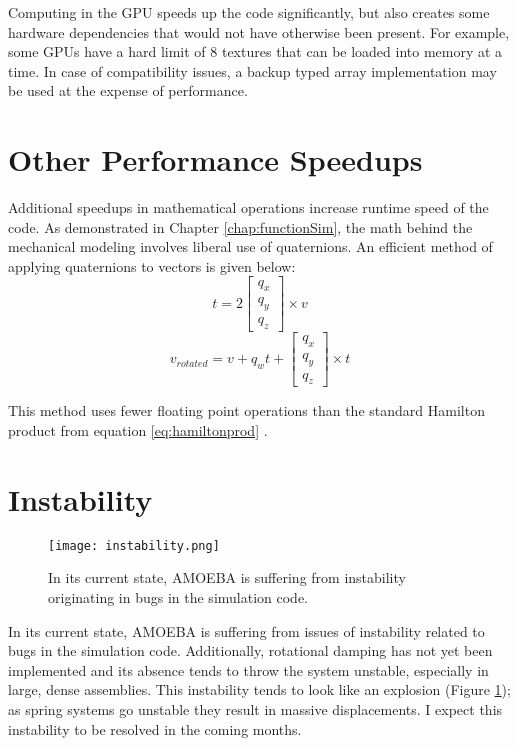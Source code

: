 {Computing in the GPU speeds up the code significantly, but also creates some hardware dependencies that would not have otherwise been present.  For example, some GPUs have a hard limit of 8 textures that can be loaded into memory at a time.  In case of compatibility issues, a backup typed array implementation may be used at the expense of performance.

\section{Other Performance Speedups}

Additional speedups in mathematical operations increase runtime speed of the code.  As demonstrated in Chapter \ref{chap:functionSim}, the math behind the mechanical modeling involves liberal use of quaternions.  An efficient method of applying quaternions to vectors is given below:
\[ t = 2 \left[ \begin{array}{ccc}
q_x\\
q_y\\
q_z
 \end{array} \right] \times v\]
\[ v_{rotated} = v + q_wt +  \left[ \begin{array}{ccc}
q_x\\
q_y\\
q_z
 \end{array} \right] \times t\]
 
 This method uses fewer floating point operations than the standard Hamilton product from equation \ref{eq:hamiltonprod} \cite{Reinalter}.

\section{Instability}

\begin{figure}
  \texttt{[image: instability.png]}
  \caption{In its current state, AMOEBA is suffering from instability originating in bugs in the simulation code.}
  \label{fig:instability}
\end{figure}

In its current state, AMOEBA is suffering from issues of instability related to bugs in the simulation code.  Additionally, rotational damping has not yet been implemented and its absence tends to throw the system unstable, especially in large, dense assemblies.  This instability tends to look like an explosion (Figure \ref{fig:instability}); as spring systems go unstable they result in massive displacements.  I expect this instability to be resolved in the coming months.

}
